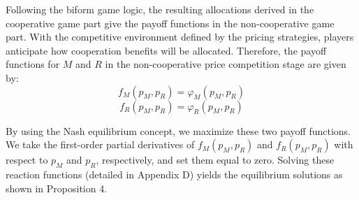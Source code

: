 \documentclass[authoryear,preprint,review,times,10pt]{elsarticle}
\begin{document}
Following the biform game logic, the resulting allocations derived in the cooperative game part give the payoff functions in the non-cooperative game part. With the competitive environment defined by the pricing strategies, players anticipate how cooperation benefits will be allocated. Therefore, the payoff functions for $M$ and $R$ in the non-cooperative price competition stage are given by:
\begin{equation}
f_M(p_M, p_R) = \varphi_M(p_M, p_R)
\end{equation}
\begin{equation}
f_R(p_M, p_R) = \varphi_R(p_M, p_R)
\end{equation}

By using the Nash equilibrium concept, we maximize these two payoff functions. We take the first-order partial derivatives of $f_M(p_M, p_R)$ and $f_R(p_M, p_R)$ with respect to $p_M$ and $p_R$, respectively, and set them equal to zero. Solving these reaction functions (detailed in Appendix D) yields the equilibrium solutions as shown in Proposition 4.
\end{document}
